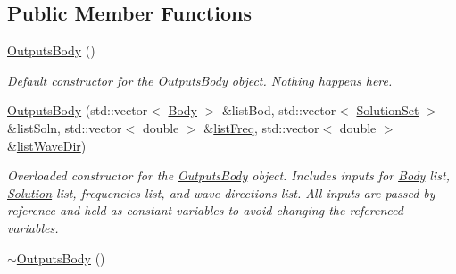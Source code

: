 \subsection*{Public Member Functions}
\begin{DoxyCompactItemize}
\item 
\hypertarget{classosea_1_1ofreq_1_1_outputs_body_a6898483a0919f9bb9cd82e3036a59a14}{\hyperlink{classosea_1_1ofreq_1_1_outputs_body_a6898483a0919f9bb9cd82e3036a59a14}{Outputs\-Body} ()}\label{classosea_1_1ofreq_1_1_outputs_body_a6898483a0919f9bb9cd82e3036a59a14}

\begin{DoxyCompactList}\small\item\em Default constructor for the \hyperlink{classosea_1_1ofreq_1_1_outputs_body}{Outputs\-Body} object. Nothing happens here. \end{DoxyCompactList}\item 
\hyperlink{classosea_1_1ofreq_1_1_outputs_body_a03921b36c8a8323eb08355d267c0c626}{Outputs\-Body} (std\-::vector$<$ \hyperlink{classosea_1_1ofreq_1_1_body}{Body} $>$ \&list\-Bod, std\-::vector$<$ \hyperlink{classosea_1_1ofreq_1_1_solution_set}{Solution\-Set} $>$ \&list\-Soln, std\-::vector$<$ double $>$ \&\hyperlink{classosea_1_1ofreq_1_1_outputs_body_a6b28621ef475c1d917270e2259e1629f}{list\-Freq}, std\-::vector$<$ double $>$ \&\hyperlink{classosea_1_1ofreq_1_1_outputs_body_a710a66d19fb8ba5a6c9c15e0143f832e}{list\-Wave\-Dir})
\begin{DoxyCompactList}\small\item\em Overloaded constructor for the \hyperlink{classosea_1_1ofreq_1_1_outputs_body}{Outputs\-Body} object. Includes inputs for \hyperlink{classosea_1_1ofreq_1_1_body}{Body} list, \hyperlink{classosea_1_1ofreq_1_1_solution}{Solution} list, frequencies list, and wave directions list. All inputs are passed by reference and held as constant variables to avoid changing the referenced variables. \end{DoxyCompactList}\item 
\hypertarget{classosea_1_1ofreq_1_1_outputs_body_a9ec0c3721f511168c425b792bdaf2d62}{\hyperlink{classosea_1_1ofreq_1_1_outputs_body_a9ec0c3721f511168c425b792bdaf2d62}{$\sim$\-Outputs\-Body} ()}\label{classosea_1_1ofreq_1_1_outputs_body_a9ec0c3721f511168c425b792bdaf2d62}


\end{DoxyCompactItemize}
